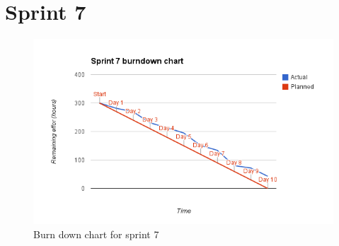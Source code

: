\section{Sprint 7}
\begin{figure}[H]
\includegraphics[width=\textwidth]{appendix/backlog/burndown7.png}
\caption{Burn down chart for sprint 7}
\end{figure}


